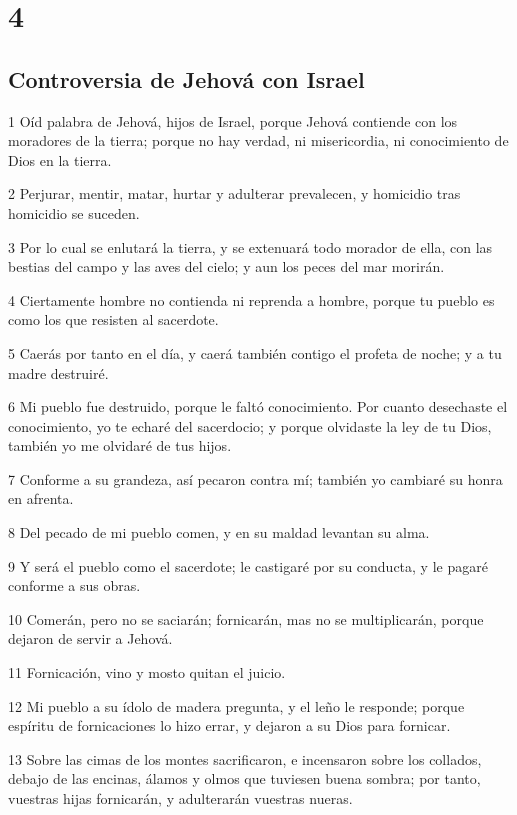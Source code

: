 \chapter{4}

\section*{Controversia de Jehová con Israel}

\par 1 Oíd palabra de Jehová, hijos de Israel, porque Jehová contiende con los moradores de la tierra; porque no hay verdad, ni misericordia, ni conocimiento de Dios en la tierra.
\par 2 Perjurar, mentir, matar, hurtar y adulterar prevalecen, y homicidio tras homicidio se suceden.
\par 3 Por lo cual se enlutará la tierra, y se extenuará todo morador de ella, con las bestias del campo y las aves del cielo; y aun los peces del mar morirán.
\par 4 Ciertamente hombre no contienda ni reprenda a hombre, porque tu pueblo es como los que resisten al sacerdote.
\par 5 Caerás por tanto en el día, y caerá también contigo el profeta de noche; y a tu madre destruiré.
\par 6 Mi pueblo fue destruido, porque le faltó conocimiento. Por cuanto desechaste el conocimiento, yo te echaré del sacerdocio; y porque olvidaste la ley de tu Dios, también yo me olvidaré de tus hijos.
\par 7 Conforme a su grandeza, así pecaron contra mí; también yo cambiaré su honra en afrenta.
\par 8 Del pecado de mi pueblo comen, y en su maldad levantan su alma.
\par 9 Y será el pueblo como el sacerdote; le castigaré por su conducta, y le pagaré conforme a sus obras.
\par 10 Comerán, pero no se saciarán; fornicarán, mas no se multiplicarán, porque dejaron de servir a Jehová.
\par 11 Fornicación, vino y mosto quitan el juicio.
\par 12 Mi pueblo a su ídolo de madera pregunta, y el leño le responde; porque espíritu de fornicaciones lo hizo errar, y dejaron a su Dios para fornicar.
\par 13 Sobre las cimas de los montes sacrificaron, e incensaron sobre los collados, debajo de las encinas, álamos y olmos que tuviesen buena sombra; por tanto, vuestras hijas fornicarán, y adulterarán vuestras nueras.
